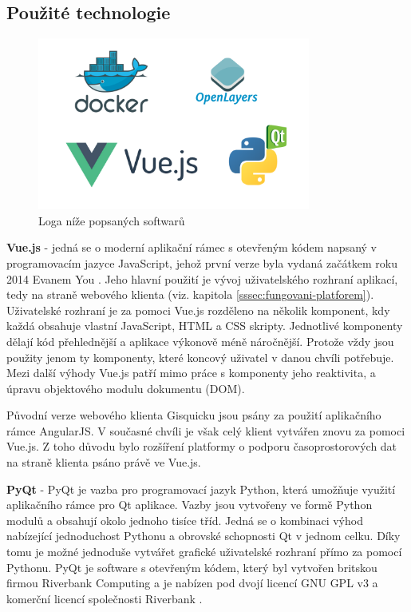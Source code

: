 \newpage
\subsection{Použité technologie}

\begin{figure}[h!]
\centering
\includegraphics[width=0.8\textwidth]{../img/technologies.png}
\caption{Loga níže popsaných softwarů}
\label{fig:technoogies}
\end{figure}

\noindent
\textbf{Vue.js} - jedná se o moderní aplikační rámec s otevřeným kódem
napsaný v programovacím jazyce JavaScript, jehož první verze byla vydaná
začátkem roku 2014 Evanem You \cite{vue-history}. Jeho hlavní použití je
vývoj uživatelského rozhraní aplikací, tedy na straně webového klienta
(viz. kapitola \ref{sssec:fungovani-platforem}). Uživatelské rozhraní
je za pomoci Vue.js rozděleno na několik  komponent, kdy každá obsahuje
vlastní JavaScript, HTML a CSS skripty. Jednotlivé komponenty dělají kód
přehlednější a aplikace výkonově méně náročnější. Protože vždy
jsou použity jenom ty komponenty, které koncový uživatel v danou chvíli
potřebuje. Mezi další výhody Vue.js patří mimo práce s komponenty
jeho reaktivita, a úpravu objektového modulu dokumentu (DOM).

Původní verze webového klienta Gisquicku jsou psány za použití
aplikačního rámce AngularJS. V současné chvíli je však celý klient
vytvářen znovu za pomoci Vue.js. Z toho důvodu bylo rozšíření platformy
o podporu časoprostorových dat na straně klienta psáno právě ve Vue.js.

\newpage
\bigskip
\noindent
\textbf{PyQt} - PyQt je vazba pro programovací jazyk Python, která umožňuje
využití aplikačního rámce pro Qt aplikace. Vazby jsou vytvořeny ve formě
Python modulů a obsahují okolo jednoho tisíce tříd. Jedná se o kombinaci
výhod nabízející jednoduchost Pythonu a obrovské schopnosti Qt v jednom
celku. Díky tomu je možné jednoduše vytvářet grafické uživatelské
rozhraní přímo za pomocí Pythonu. PyQt je software s otevřeným kódem,
který byl vytvořen britskou firmou Riverbank Computing a je nabízen pod
dvojí licencí GNU GPL v3 a komerční licencí společnosti Riverbank
\cite{pyqt}.

